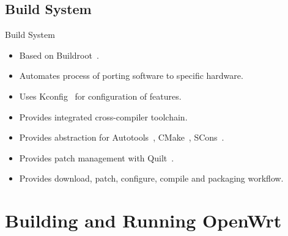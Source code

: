 \subsection{Build System}
\begin{frame}{Build System}
    \pause
    \begin{itemize}[<+-|alert@+>]
        \item Based on Buildroot~\cite{buildroot}.
        \item Automates process of porting software to specific hardware.
        \item Uses Kconfig~\cite{linux-kconfig} for configuration of features.
        \item Provides integrated cross-compiler toolchain.
        \item Provides abstraction for Autotools~\cite{gnu-autotools}, CMake~\cite{kitware-cmake}, SCons~\cite{scons}.
        \item Provides patch management with Quilt~\cite{fsf-quilt}.
        \item Provides download, patch, configure, compile and packaging workflow.
    \end{itemize}
\end{frame}

\section{Building and Running OpenWrt}

